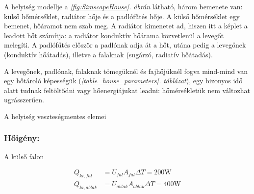 A helyiség modellje a \textit{\ref{fig:SimscapeHouse}. ábrán} látható, három bemenete van: külső hőmérséklet, radiátor hője és a padlófűtés hője.
A külső hőmérséklet egy  bemenet, hőáramot nem szab meg.
A radiátor  kimenetet ad, hiszen itt a képlet a leadott hőt számítja: a radiátor konduktív hőárama közvetlenül a levegőt melegíti. A padlófűtés először a padlónak adja át a hőt, utána pedig a levegőnek (konduktív hőátadás), illetve a falaknak (sugárzó, radiatív hőátadás).

A levegőnek, padlónak, falaknak tömegüknél és fajhőjüknél fogva mind-mind van egy hőtároló képességük (\textit{\ref{table_house_parameters}. táblázat}), egy bizonyos idő alatt tudnak feltöltődni vagy hőenergiájukat leadni: hőmérsékletük nem változhat ugrásszerűen. %


\begin{table}[H]
	\footnotesize
	\centering
	\caption{A helyiség hőveszteséget okozó elemei}
	\renewcommand{\arraystretch}{1.3} %
	
%		
	\label{table_house_parameters}
\end{table}

\begin{table}[H]
	\footnotesize
	\centering
	\caption{A helyiség veszteségmentes elemei}
	\renewcommand{\arraystretch}{1.3} %
	
	\label{table_house_parametersB}
\end{table}



\subsubsection*{Hőigény:}

A külső falon

\begin{equation}\label{eq_hoigeny}
\begin{aligned}
		Q_{ki,fal} &= U_{fal}A_{fal}\Delta T = 200\si{\watt}\\[10pt]
		Q_{ki,ablak} &= U_{ablak}A_{ablak}\Delta T = 400\si{\watt}
\end{aligned}
\end{equation}

